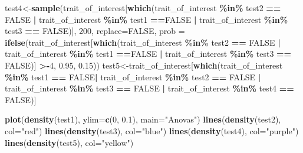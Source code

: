 \documentclass[
]{article}
\newenvironment{Shaded}{\begin{snugshade}}{\end{snugshade}}
\newcommand{\AttributeTok}[1]{\textcolor[rgb]{0.13,0.29,0.53}{#1}}
\newcommand{\ConstantTok}[1]{\textcolor[rgb]{0.56,0.35,0.01}{#1}}
\newcommand{\DecValTok}[1]{\textcolor[rgb]{0.00,0.00,0.81}{#1}}
\newcommand{\FloatTok}[1]{\textcolor[rgb]{0.00,0.00,0.81}{#1}}
\newcommand{\FunctionTok}[1]{\textcolor[rgb]{0.13,0.29,0.53}{\textbf{#1}}}
\newcommand{\NormalTok}[1]{#1}
\newcommand{\OtherTok}[1]{\textcolor[rgb]{0.56,0.35,0.01}{#1}}
\newcommand{\SpecialCharTok}[1]{\textcolor[rgb]{0.81,0.36,0.00}{\textbf{#1}}}
\newcommand{\StringTok}[1]{\textcolor[rgb]{0.31,0.60,0.02}{#1}}
\begin{document}
\begin{Shaded}
\begin{Highlighting}[]
\NormalTok{test4}\OtherTok{\textless{}{-}}\FunctionTok{sample}\NormalTok{(trait\_of\_interest[}\FunctionTok{which}\NormalTok{(trait\_of\_interest }\SpecialCharTok{\%in\%}\NormalTok{ test2 }\SpecialCharTok{==} \ConstantTok{FALSE} \SpecialCharTok{|}\NormalTok{ trait\_of\_interest }\SpecialCharTok{\%in\%}\NormalTok{ test1 }\SpecialCharTok{==}\ConstantTok{FALSE} \SpecialCharTok{|}\NormalTok{ trait\_of\_interest }\SpecialCharTok{\%in\%}\NormalTok{ test3 }\SpecialCharTok{==} \ConstantTok{FALSE}\NormalTok{)], }\DecValTok{200}\NormalTok{, }\AttributeTok{replace=}\ConstantTok{FALSE}\NormalTok{, }\AttributeTok{prob =} \FunctionTok{ifelse}\NormalTok{(trait\_of\_interest[}\FunctionTok{which}\NormalTok{(trait\_of\_interest }\SpecialCharTok{\%in\%}\NormalTok{ test2 }\SpecialCharTok{==} \ConstantTok{FALSE} \SpecialCharTok{|}\NormalTok{ trait\_of\_interest }\SpecialCharTok{\%in\%}\NormalTok{ test1 }\SpecialCharTok{==}\ConstantTok{FALSE} \SpecialCharTok{|}\NormalTok{ trait\_of\_interest }\SpecialCharTok{\%in\%}\NormalTok{ test3 }\SpecialCharTok{==} \ConstantTok{FALSE}\NormalTok{)] }\SpecialCharTok{\textgreater{}{-}}\DecValTok{4}\NormalTok{, }\FloatTok{0.95}\NormalTok{, }\FloatTok{0.15}\NormalTok{))}
\NormalTok{test5}\OtherTok{\textless{}{-}}\NormalTok{trait\_of\_interest[}\FunctionTok{which}\NormalTok{(trait\_of\_interest }\SpecialCharTok{\%in\%}\NormalTok{ test1 }\SpecialCharTok{==} \ConstantTok{FALSE}\SpecialCharTok{|}\NormalTok{ trait\_of\_interest }\SpecialCharTok{\%in\%}\NormalTok{ test2 }\SpecialCharTok{==} \ConstantTok{FALSE} \SpecialCharTok{|}\NormalTok{ trait\_of\_interest }\SpecialCharTok{\%in\%}\NormalTok{ test3 }\SpecialCharTok{==} \ConstantTok{FALSE} \SpecialCharTok{|}\NormalTok{ trait\_of\_interest }\SpecialCharTok{\%in\%}\NormalTok{ test4 }\SpecialCharTok{==} \ConstantTok{FALSE}\NormalTok{)]}


\FunctionTok{plot}\NormalTok{(}\FunctionTok{density}\NormalTok{(test1), }\AttributeTok{ylim=}\FunctionTok{c}\NormalTok{(}\DecValTok{0}\NormalTok{, }\FloatTok{0.1}\NormalTok{), }\AttributeTok{main=}\StringTok{"Anovas"}\NormalTok{)}
\FunctionTok{lines}\NormalTok{(}\FunctionTok{density}\NormalTok{(test2), }\AttributeTok{col=}\StringTok{"red"}\NormalTok{)}
\FunctionTok{lines}\NormalTok{(}\FunctionTok{density}\NormalTok{(test3), }\AttributeTok{col=}\StringTok{"blue"}\NormalTok{)}
\FunctionTok{lines}\NormalTok{(}\FunctionTok{density}\NormalTok{(test4), }\AttributeTok{col=}\StringTok{"purple"}\NormalTok{)}
\FunctionTok{lines}\NormalTok{(}\FunctionTok{density}\NormalTok{(test5), }\AttributeTok{col=}\StringTok{"yellow"}\NormalTok{)}
\end{Highlighting}
\end{Shaded}
\end{document}
